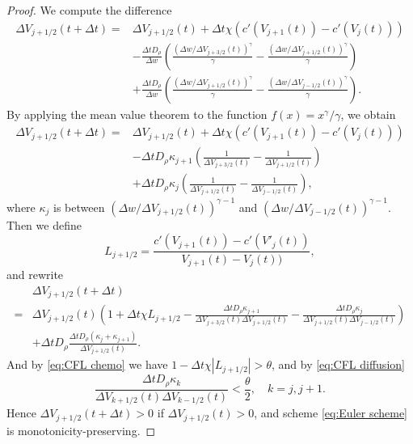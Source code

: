 \documentclass{article}
\begin{document}
  \begin{proof}
  We compute the difference
    \[
      \begin{aligned}
        \Delta V_{j + 1 / 2}(t + \Delta t) =& \Delta V_{j + 1 / 2}(t)
          + \Delta t\chi\left(c'(V_{j + 1}(t)) - c'(V_j(t))\right) \\
          &- \frac{\Delta tD_\rho}{\Delta w}\left(
              \frac{\left(\Delta w / \Delta V_{j + 3 / 2}(t)\right)^\gamma}{\gamma}
              - \frac{\left(\Delta w / \Delta V_{j + 1 / 2}(t)\right)^\gamma}{\gamma}
            \right) \\
          &+ \frac{\Delta tD_\rho}{\Delta w}\left(
              \frac{\left(\Delta w / \Delta V_{j + 1 / 2}(t)\right)^\gamma}{\gamma}
              - \frac{\left(\Delta w / \Delta V_{j - 1 / 2}(t)\right)^\gamma}{\gamma}
            \right).
      \end{aligned}
    \]
    By applying the mean value theorem to the function $f(x) = x^\gamma / \gamma$,
    we obtain
    \[
      \begin{aligned}
        \Delta V_{j + 1 / 2}(t + \Delta t) =& \Delta V_{j + 1 / 2}(t)
          + \Delta t\chi\left(c'(V_{j + 1}(t)) - c'(V_j(t))\right) \\
          &- \Delta tD_\rho\kappa_{j + 1}\left(
            \frac 1{\Delta V_{j + 3 / 2}(t)} - \frac 1{\Delta V_{j + 1 / 2}(t)}
            \right) \\
          &+ \Delta tD_\rho\kappa_j\left(
            \frac 1{\Delta V_{j + 1 / 2}(t)} - \frac 1{\Delta V_{j - 1 / 2}(t)}
            \right),
      \end{aligned}
    \]
    where $\kappa_j$ is between $\left(\Delta w / \Delta V_{j + 1 / 2}(t)\right)^{\gamma - 1}$
    and $\left(\Delta w / \Delta V_{j - 1 / 2}(t)\right)^{\gamma - 1}$.
    Then we define
    \[
      L_{j + 1 / 2} = \frac{c'(V_{j + 1}(t)) - c'(V'_j(t))}{V_{j + 1}(t) - V_j(t))},
    \]
    and rewrite
    \[
      \begin{aligned}
         &\Delta V_{j + 1 / 2}(t + \Delta t)\\
        =& \Delta V_{j + 1 / 2}(t)
        \left(
          1 + \Delta t\chi L_{j + 1 / 2}
          - \frac{\Delta t D_\rho\kappa_{j + 1}}{\Delta V_{j + 3 / 2}(t)\Delta V_{j + 1 / 2}(t)}
          - \frac{\Delta t D_\rho\kappa_j}{\Delta V_{j + 1 / 2}(t)\Delta V_{j - 1 / 2}(t)}
        \right)\\
         &+ \Delta t D_\rho\frac{\Delta t D_\rho(\kappa_j + \kappa_{j + 1})}{\Delta V_{j + 1 / 2}(t)}.
      \end{aligned}
    \]
    And by \cref{eq:CFL chemo} we have $1 - \Delta t\chi\left|L_{j + 1 / 2}\right| > \theta$,
    and by \cref{eq:CFL diffusion}
    \[
      \frac{\Delta t D_\rho \kappa_k}{\Delta V_{k + 1 / 2}(t)\Delta V_{k - 1 / 2}(t)}
      < \frac\theta 2,\quad k = j, j + 1.
    \]
    Hence $\Delta V_{j + 1 / 2}(t + \Delta t) > 0$ if $\Delta V_{j + 1 / 2}(t) > 0$, and scheme
    \ref{eq:Euler scheme} is monotonicity-preserving.
  \end{proof}
\end{document}
